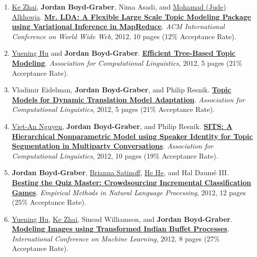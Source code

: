 {\begin{enumerate}
	 \item \underline{\href{https://kzhai.github.io/}{Ke Zhai}}, {\bf Jordan Boyd-Graber}, Nima Asadi, and \underline{Mohamad (Jude) Alkhouja}.  {\bf \href{http://cs.umd.edu/~jbg//docs/2012_www_mrlda.pdf}{{Mr. LDA}: A Flexible Large Scale Topic Modeling Package using Variational Inference in MapReduce}}.  \emph{ACM International Conference on World Wide Web}, 2012, 10 pages (12\% Acceptance Rate).

	 \item \underline{\href{https://scholar.google.com/citations?user=mO_62fQAAAAJ&hl=en}{Yuening Hu}} and {\bf Jordan Boyd-Graber}.  {\bf \href{http://cs.umd.edu/~jbg//docs/acl_2012_fttm.pdf}{Efficient Tree-Based Topic Modeling}}.  \emph{Association for Computational Linguistics}, 2012, 5 pages (21\% Acceptance Rate).

	 \item Vladimir Eidelman, {\bf Jordan Boyd-Graber}, and Philip Resnik.  {\bf \href{http://cs.umd.edu/~jbg//docs/acl_2012_tm_for_mt.pdf}{Topic Models for Dynamic Translation Model Adaptation}}.  \emph{Association for Computational Linguistics}, 2012, 5 pages (21\% Acceptance Rate).

	 \item \underline{\href{https://viet-an.github.io/}{Viet-An Nguyen}}, {\bf Jordan Boyd-Graber}, and Philip Resnik.  {\bf \href{http://cs.umd.edu/~jbg//docs/acl_2012_sits.pdf}{{SITS}: A Hierarchical Nonparametric Model using Speaker Identity for Topic Segmentation in Multiparty Conversations}}.  \emph{Association for Computational Linguistics}, 2012, 10 pages (19\% Acceptance Rate).

	 \item {\bf Jordan Boyd-Graber}, \underline{Brianna Satinoff}, \underline{\href{https://hhexiy.github.io/}{He He}}, and Hal {Daum\'{e} III}.  {\bf \href{http://cs.umd.edu/~jbg//docs/qb_emnlp_2012.pdf}{Besting the Quiz Master: Crowdsourcing Incremental Classification Games}}.  \emph{Empirical Methods in Natural Language Processing}, 2012, 12 pages (25\% Acceptance Rate).

	 \item \underline{\href{https://scholar.google.com/citations?user=mO_62fQAAAAJ&hl=en}{Yuening Hu}}, \underline{\href{https://kzhai.github.io/}{Ke Zhai}}, Sinead Williamson, and {\bf Jordan Boyd-Graber}.  {\bf \href{http://cs.umd.edu/~jbg//docs/mtibp_icml_2012.pdf}{Modeling Images using Transformed {I}ndian Buffet Processes}}.  \emph{International Conference on Machine Learning}, 2012, 8 pages (27\% Acceptance Rate).


\end{enumerate}}
